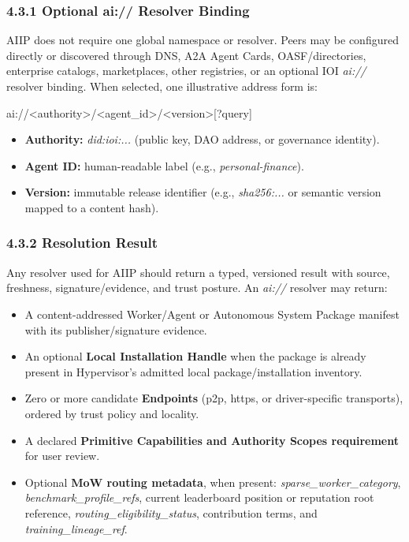 \documentclass[
  11pt,
]{article}
\providecommand{\tightlist}{%
  \setlength{\itemsep}{0pt}\setlength{\parskip}{0pt}}
\begin{document}
\hypertarget{the-aiip-uri-scheme}{%
\subsubsection{4.3.1 Optional ai:// Resolver
Binding}\label{the-aiip-uri-scheme}}

AIIP does not require one global namespace or resolver. Peers may be configured
directly or discovered through DNS, A2A Agent Cards, OASF/directories,
enterprise catalogs, marketplaces, other registries, or an optional IOI
\emph{ai://} resolver binding. When selected, one illustrative address form is:

ai://\textless authority\textgreater/\textless agent\_id\textgreater/\textless version\textgreater{[}?query{]}

\begin{itemize}
\tightlist
\item
  \textbf{Authority:} \emph{did:ioi:...} (public key, DAO address, or
  governance identity).
\item
  \textbf{Agent ID:} human-readable label (e.g.,
  \emph{personal-finance}).
\item
  \textbf{Version: }immutable release identifier (e.g.,
  \emph{sha256:...} or semantic version mapped to a content hash).
\end{itemize}

\hypertarget{resolution-result}{%
\subsubsection{4.3.2 Resolution Result}\label{resolution-result}}

Any resolver used for AIIP should return a typed, versioned result with source,
freshness, signature/evidence, and trust posture. An \emph{ai://} resolver may
return:

\begin{itemize}
\tightlist
\item
  A content-addressed Worker/Agent or Autonomous System Package manifest with
  its publisher/signature evidence.
\item
  An optional \textbf{Local Installation Handle} when the package is already
  present in Hypervisor's admitted local package/installation inventory.
\item
  Zero or more candidate \textbf{Endpoints }(p2p, https, or
  driver-specific transports), ordered by trust policy and locality.
\item
  A declared \textbf{Primitive Capabilities and Authority Scopes
  requirement} for user review.
\item
  Optional \textbf{MoW routing metadata}, when present:
  \emph{sparse\_worker\_category}, \emph{benchmark\_profile\_refs},
  current leaderboard position or reputation root reference,
  \emph{routing\_eligibility\_status}, contribution terms, and
  \emph{training\_lineage\_ref}.
\end{itemize}
\end{document}
